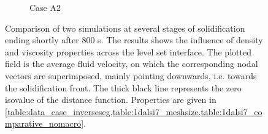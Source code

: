 \begin{figure}[htbp]
\begin{subfigure}{0.55\textwidth}
	\caption{Case A2}
    \label{fig:1dalsi7_equalprops}
  \end{subfigure}
\caption{Comparison of two simulations at several stages of solidification ending shortly after 800 s.
The results shows the influence of density and viscosity properties across the level set interface.
The plotted field is the average fluid velocity, on which the corresponding nodal vectors are superimposed, mainly pointing
downwards, i.e. towards the solidification front. The thick black line represents the zero isovalue of the distance function.
Properties are given in \cref{table:data_case_inverseseg,table:1dalsi7_meshsize,table:1dalsi7_comparative_nomacro}.}
\label{fig:1dalsi7_caseA1A2}
\end{figure}

